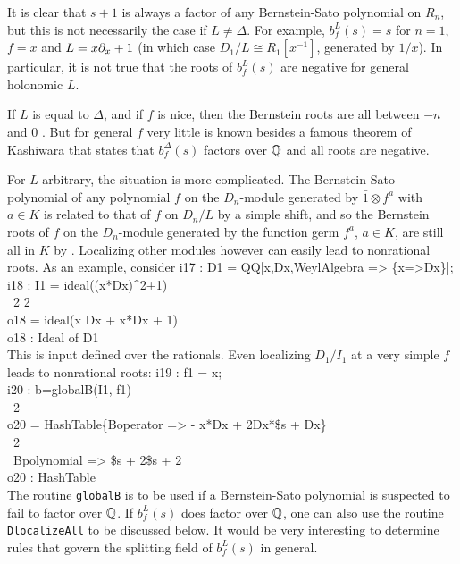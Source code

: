 \begin{remark}
It is clear that $s+1$ is always a factor of any Bernstein-Sato
polynomial on $R_n$, but this is not necessarily the case if $L\not =
\Delta$. For example, 
$b^L_f(s)=s$ for $n=1$, $f=x$ and $L=x\partial_x+1$ (in which case
$D_1/L\cong R_1[x^{-1}]$, generated by ${1}/{x}$). 
In particular, it is not true that
the roots of $b_f^L(s)$ are negative for general holonomic $L$. 

If $L$ is equal to $\Delta$, and if
$f$ is nice, then the Bernstein roots are all between $-n$ and $0$
\cite{DM:Varchenko}.  But for  general $f$ very little is known besides
a famous theorem of Kashiwara
 that states that $b^\Delta_f(s)$ factors over
${\mathbb Q}$ \cite{DM:K} and all roots are negative.

For $L$ arbitrary, the situation is more complicated.
The Bernstein-Sato polynomial of any polynomial $f$ on the
$D_n$-module generated by $\bar 1\otimes f^a$ with $a\in K$ is
related to that of $f$ on $D_n/L$ by a simple shift, and so the
Bernstein roots of $f$ on the $D_n$-module generated by the function
germ $f^a$, $a\in K$,  
are still all
in $K$  by
\cite{DM:K}. Localizing other modules however can easily lead to
nonrational roots. As an example, consider
\beginOutput
i17 : D1 = QQ[x,Dx,WeylAlgebra => \{x=>Dx\}];\\
\endOutput
\beginOutput
i18 : I1 = ideal((x*Dx)^2+1)\\
\emptyLine
\             2  2\\
o18 = ideal(x Dx  + x*Dx + 1)\\
\emptyLine
o18 : Ideal of D1\\
\endOutput
This is input defined over the rationals.
Even localizing $D_1/I_1$ at a very simple $f$ leads to nonrational roots:
\beginOutput
i19 : f1 = x;\\
\endOutput
\beginOutput
i20 : b=globalB(I1, f1)\\
\emptyLine
\                                   2\\
o20 = HashTable\{Boperator => - x*Dx  + 2Dx*\$s + Dx\}\\
\                                 2\\
\                Bpolynomial => \$s  + 2\$s + 2\\
\emptyLine
o20 : HashTable\\
\endOutput
The routine {\tt globalB} is to be used if a Bernstein-Sato polynomial
is suspected to fail to factor over ${\mathbb Q}$. If $b_f^L(s)$ does factor
over ${\mathbb Q}$, one can also use the routine {\tt DlocalizeAll} to be
discussed below. It
would be very interesting to determine rules that govern the splitting field
of $b^L_f(s)$ in general.


\end{remark}

